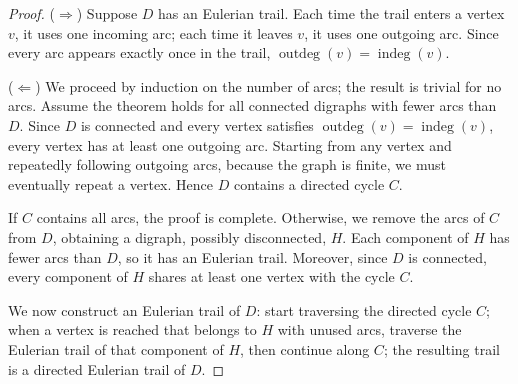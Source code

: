 \begin{proof}
($\Rightarrow$) Suppose $D$ has an Eulerian trail. Each time the trail enters a vertex $v$, it uses one incoming arc; each time it leaves $v$, it uses one outgoing arc. Since every arc appears exactly once in the trail, $\operatorname{outdeg}(v) = \operatorname{indeg}(v)$.

\medskip
\noindent ($\Leftarrow$) We proceed by induction on the number of arcs; the result is trivial for no arcs. Assume the theorem holds for all connected digraphs with fewer arcs than $D$. Since $D$ is connected and every vertex satisfies $\operatorname{outdeg}(v) = \operatorname{indeg}(v)$, every vertex has at least one outgoing arc. Starting from any vertex and repeatedly following outgoing arcs, because the graph is finite, we must eventually repeat a vertex. Hence $D$ contains a directed cycle $C$.

If $C$ contains all arcs, the proof is complete. Otherwise, we remove the arcs of $C$ from $D$, obtaining a digraph, possibly disconnected, $H$. Each component of $H$ has fewer arcs than $D$, so it has an Eulerian trail. Moreover, since $D$ is connected, every component of $H$ shares at least one vertex with the cycle $C$.

We now construct an Eulerian trail of $D$: start traversing the directed cycle $C$; when a vertex is reached that belongs to $H$ with unused arcs, traverse the Eulerian trail of that component of $H$, then continue along $C$; the resulting trail is a directed Eulerian trail of $D$.
\end{proof}
